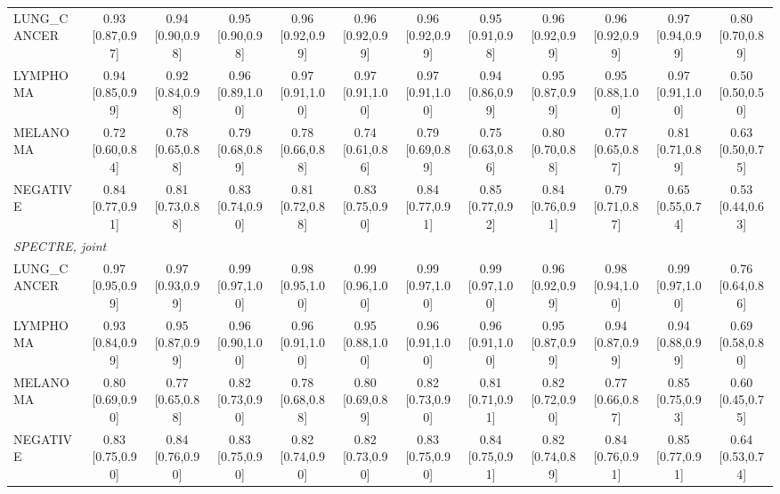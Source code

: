 \begin{tabular}{lccccccccccc}
LUNG\_CANCER & 0.93 [0.87,0.97] & 0.94 [0.90,0.98] & 0.95 [0.90,0.98] & 0.96 [0.92,0.99] & 0.96 [0.92,0.99] & 0.96 [0.92,0.99] & 0.95 [0.91,0.98] & 0.96 [0.92,0.99] & 0.96 [0.92,0.99] & 0.97 [0.94,0.99] & 0.80 [0.70,0.89] \\
LYMPHOMA & 0.94 [0.85,0.99] & 0.92 [0.84,0.98] & 0.96 [0.89,1.00] & 0.97 [0.91,1.00] & 0.97 [0.91,1.00] & 0.97 [0.91,1.00] & 0.94 [0.86,0.99] & 0.95 [0.87,0.99] & 0.95 [0.88,1.00] & 0.97 [0.91,1.00] & 0.50 [0.50,0.50] \\
MELANOMA & 0.72 [0.60,0.84] & 0.78 [0.65,0.88] & 0.79 [0.68,0.89] & 0.78 [0.66,0.88] & 0.74 [0.61,0.86] & 0.79 [0.69,0.89] & 0.75 [0.63,0.86] & 0.80 [0.70,0.88] & 0.77 [0.65,0.87] & 0.81 [0.71,0.89] & 0.63 [0.50,0.75] \\
NEGATIVE & 0.84 [0.77,0.91] & 0.81 [0.73,0.88] & 0.83 [0.74,0.90] & 0.81 [0.72,0.88] & 0.83 [0.75,0.90] & 0.84 [0.77,0.91] & 0.85 [0.77,0.92] & 0.84 [0.76,0.91] & 0.79 [0.71,0.87] & 0.65 [0.55,0.74] & 0.53 [0.44,0.63] \\
\multicolumn{12}{l}{\textit{SPECTRE, joint}} \\
LUNG\_CANCER & 0.97 [0.95,0.99] & 0.97 [0.93,0.99] & 0.99 [0.97,1.00] & 0.98 [0.95,1.00] & 0.99 [0.96,1.00] & 0.99 [0.97,1.00] & 0.99 [0.97,1.00] & 0.96 [0.92,0.99] & 0.98 [0.94,1.00] & 0.99 [0.97,1.00] & 0.76 [0.64,0.86] \\
LYMPHOMA & 0.93 [0.84,0.99] & 0.95 [0.87,0.99] & 0.96 [0.90,1.00] & 0.96 [0.91,1.00] & 0.95 [0.88,1.00] & 0.96 [0.91,1.00] & 0.96 [0.91,1.00] & 0.95 [0.87,0.99] & 0.94 [0.87,0.99] & 0.94 [0.88,0.99] & 0.69 [0.58,0.80] \\
MELANOMA & 0.80 [0.69,0.90] & 0.77 [0.65,0.88] & 0.82 [0.73,0.90] & 0.78 [0.68,0.88] & 0.80 [0.69,0.89] & 0.82 [0.73,0.90] & 0.81 [0.71,0.91] & 0.82 [0.72,0.90] & 0.77 [0.66,0.87] & 0.85 [0.75,0.93] & 0.60 [0.45,0.75] \\
NEGATIVE & 0.83 [0.75,0.90] & 0.84 [0.76,0.90] & 0.83 [0.75,0.90] & 0.82 [0.74,0.90] & 0.82 [0.73,0.90] & 0.83 [0.75,0.90] & 0.84 [0.75,0.91] & 0.82 [0.74,0.89] & 0.84 [0.76,0.91] & 0.85 [0.77,0.91] & 0.64 [0.53,0.74] \\
\bottomrule
\end{tabular}
